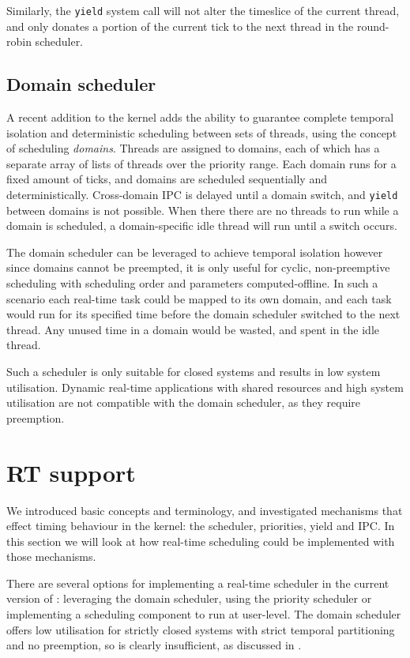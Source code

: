 Similarly, the \texttt{yield} system call will not alter the timeslice of the current thread, and
only donates a portion of the current tick to the next thread in the round-robin scheduler. 

\subsection{Domain scheduler}

A recent addition to the \selfour kernel adds the ability to guarantee complete temporal isolation and deterministic scheduling between sets of threads, using the concept of scheduling \emph{domains}.
Threads are assigned to domains, each of which has a separate array of lists of threads over the priority range.
Each domain runs for a fixed amount of ticks, and domains are scheduled sequentially and deterministically.
Cross-domain \gls{IPC} is delayed until a domain switch, and \texttt{yield} between domains is not
possible. When there there are no threads to run while a domain is scheduled, a domain-specific idle thread will run until a switch occurs.

The domain scheduler can be leveraged to achieve temporal isolation however since domains cannot be
preempted, it is only useful for cyclic, non-preemptive scheduling with scheduling order and
parameters computed-offline.
In such a scenario each real-time task could be mapped to its own domain, and each task would run for its specified time before the domain scheduler switched to the next thread.
Any unused time in a domain would be wasted, and spent in the idle thread.

Such a scheduler is only suitable for closed systems and results in low system utilisation.
Dynamic real-time applications with shared resources and high system utilisation are not compatible
with the domain scheduler, as they require preemption.

\section{RT support}

We introduced basic \selfour concepts and terminology, and investigated mechanisms that effect
timing behaviour in the kernel: the scheduler, priorities, yield and IPC. 
In this section we will look at how real-time scheduling could be implemented with those mechanisms.

There are several options for implementing a real-time scheduler in the current version of \selfour: leveraging the domain scheduler, using the priority scheduler or implementing a scheduling component to run at user-level. 
The domain scheduler offers low utilisation for strictly closed
systems with strict temporal partitioning and no preemption, so is clearly insufficient, as
discussed in .

